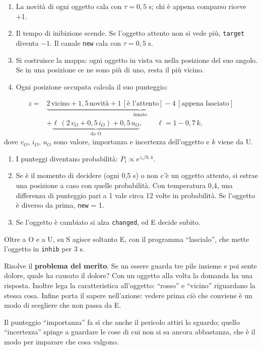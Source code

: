 \documentclass[11pt,a4paper]{article}
\newcommand{\voce}[1]{\par\smallskip\noindent{\bfseries\color{acc}#1}\par\nopagebreak}
\begin{document}
\voce{Come funziona, a ogni passo}
\begin{enumerate}
\item La novità di ogni oggetto cala con $\tau=0{,}5$ s; chi è appena comparso riceve +1.
\item Il tempo di inibizione scende. Se l'oggetto attento non si vede più, \texttt{target} diventa
  $-1$. Il canale \texttt{new} cala con $\tau=0{,}5$ s.
\item Si costruisce la mappa: ogni oggetto in vista va nella posizione del suo angolo. Se in una
  posizione ce ne sono più di uno, resta il più vicino.
\item Ogni posizione occupata calcola il suo punteggio:
\end{enumerate}
\begin{align*}
z={}&\underbrace{2\,\text{vicino}+1{,}5\,\text{novità}+1\,[\text{è l'attento}]-4\,[\text{appena lasciato}]}_{\text{innato}}\\
&+\underbrace{\ell\,(2\,v_O+0{,}5\,i_O)+0{,}5\,u_O}_{\text{da O}},
\qquad \ell=1-0{,}7\,k,
\end{align*}
dove $v_O$, $i_O$, $u_O$ sono valore, importanza e incertezza dell'oggetto e $k$ viene da U.
\begin{enumerate}[resume]
\item I punteggi diventano probabilità: $P_i\propto e^{z_i/0{,}4}$.
\item Se è il momento di decidere (ogni 0,5 s) o non c'è un oggetto attento, si estrae una
  posizione a caso con quelle probabilità. Con temperatura 0,4, una differenza di punteggio pari a 1
  vale circa 12 volte in probabilità. Se l'oggetto è diverso da prima, \texttt{new} = 1.
\item Se l'oggetto è cambiato si alza \texttt{changed}, ed E decide subito.
\end{enumerate}
Oltre a O e a U, su S agisce soltanto E, con il programma ``lascialo'', che mette l'oggetto in
\texttt{inhib} per 3 s.

\voce{Perché serve}
Risolve il \textbf{problema del merito}. Se un essere guarda tre pile insieme e poi
sente dolore, quale ha causato il dolore? Con un oggetto alla volta la domanda ha una
risposta. Inoltre lega la caratteristica all'oggetto: ``rosso'' e ``vicino'' riguardano
la stessa cosa. Infine porta il sapere nell'azione: vedere prima ciò che conviene è un
modo di scegliere che non passa da E.

Il punteggio ``importanza'' fa sì che anche il pericolo attiri lo sguardo; quello
``incertezza'' spinge a guardare le cose di cui non si sa ancora abbastanza, che è il
modo per imparare che cosa valgono.
\end{document}
